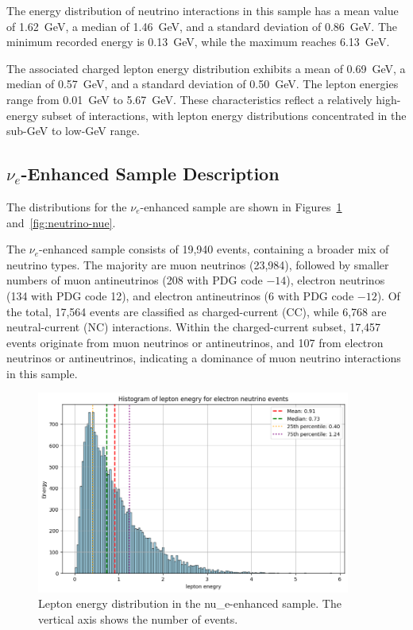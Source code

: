 \documentclass{pracalicmgr}
\begin{document}
The energy distribution of neutrino interactions in this sample has a mean value of 1.62~GeV, a median of 1.46~GeV, and a standard deviation of 0.86~GeV. The minimum recorded energy is 0.13~GeV, while the maximum reaches 6.13~GeV.

The associated charged lepton energy distribution exhibits a mean of 0.69~GeV, a median of 0.57~GeV, and a standard deviation of 0.50~GeV. The lepton energies range from 0.01~GeV to 5.67~GeV. These characteristics reflect a relatively high-energy subset of interactions, with lepton energy distributions concentrated in the sub-GeV to low-GeV range.

\subsection{\texorpdfstring{$\nu_e$}{νₑ}-Enhanced Sample Description}

The distributions for the $\nu_e$-enhanced sample are shown in Figures~\ref{fig:lepton-nue} and~\ref{fig:neutrino-nue}.

The $\nu_e$-enhanced sample consists of 19,940 events, containing a broader mix of neutrino types. The majority are muon neutrinos (23,984), followed by smaller numbers of muon antineutrinos (208 with PDG code $-14$), electron neutrinos (134 with PDG code 12), and electron antineutrinos (6 with PDG code $-12$). Of the total, 17,564 events are classified as charged-current (CC), while 6,768 are neutral-current (NC) interactions. Within the charged-current subset, 17,457 events originate from muon neutrinos or antineutrinos, and 107 from electron neutrinos or antineutrinos, indicating a dominance of muon neutrino interactions in this sample.

\begin{figure}[H]
    \centering
    \includegraphics[width=0.92\textwidth]{src/leptonMuon.png}
    \caption{Lepton energy distribution in the nu\_e-enhanced sample. The vertical axis shows the number of events.}
    \label{fig:lepton-nue}
\end{figure}
\end{document}
